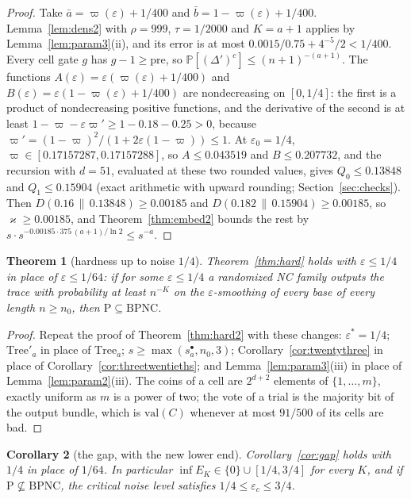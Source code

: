 \documentclass[11pt]{amsart}
\newtheorem{theorem}{Theorem}
\newtheorem{corollary}[theorem]{Corollary}
\theoremstyle{definition}
\theoremstyle{remark}
\newcommand{\eps}{\varepsilon}
\newcommand{\val}{\mathrm{val}}
\newcommand{\PP}{\mathbb{P}}
\begin{document}
\begin{proof}
Take $\bar a=\varpi(\eps)+1/400$ and $\bar b=1-\varpi(\eps)+1/400$. Lemma~\ref{lem:dens2} with
$\rho=999$, $\tau=1/2000$ and $K=a+1$ applies by Lemma~\ref{lem:param3}(ii), and its error is at
most $0.0015/0.75+4^{-5}/2<1/400$. Every cell gate $g$ has $g-1\ge\mathrm{pre}$, so
$\PP[(\Delta')^c]\le(n+1)^{-(a+1)}$. The functions $A(\eps)=\eps(\varpi(\eps)+1/400)$ and
$B(\eps)=\eps(1-\varpi(\eps)+1/400)$ are nondecreasing on $[0,1/4]$: the first is a product of
nondecreasing positive functions, and the derivative of the second is at least
$1-\varpi-\eps\varpi'\ge1-0.18-0.25>0$, because $\varpi'=(1-\varpi)^2/(1+2\eps(1-\varpi))\le1$.
At $\eps_0=1/4$, $\varpi\in[0.17157287,0.17157288]$, so $A\le0.043519$ and $B\le0.207732$, and
the recursion with $d=51$, evaluated at these two rounded values, gives $Q_0\le0.13848$ and
$Q_1\le0.15904$ (exact arithmetic with upward rounding; Section~\ref{sec:checks}). Then
$D(0.16\,\|\,0.13848)\ge0.00185$ and $D(0.182\,\|\,0.15904)\ge0.00185$, so $\varkappa\ge0.00185$, and Theorem~\ref{thm:embed2} bounds the
rest by $s\cdot s^{-0.00185\cdot375\,(a+1)/\ln2}\le s^{-a}$.
\end{proof}

\begin{theorem}[hardness up to noise $1/4$]\label{thm:hard3}
Theorem~\ref{thm:hard} holds with $\eps\le1/4$ in place of $\eps\le1/64$: if for some
$\eps\le1/4$ a randomized NC family outputs the trace with probability at least $n^{-K}$ on the
$\eps$-smoothing of every base of every length $n\ge n_0$, then $\mathrm P\subseteq\mathrm{BPNC}$.
\end{theorem}

\begin{proof}
Repeat the proof of Theorem~\ref{thm:hard2} with these changes: $\eps^*=1/4$;
$\mathrm{Tree}'_a$ in place of $\mathrm{Tree}_a$; $s\ge\max(s^\bullet_a,n_0,3)$;
Corollary~\ref{cor:twentythree} in place of Corollary~\ref{cor:threetwentieths}; and
Lemma~\ref{lem:param3}(iii) in place of Lemma~\ref{lem:param2}(iii). The coins of a cell are
$2^{d+2}$ elements of $\{1,\dots,m\}$, exactly uniform as $m$ is a power of two; the vote of a trial is the majority bit of the output bundle,
which is $\val(C)$ whenever at most $91/500$ of its cells are bad.
\end{proof}

\begin{corollary}[the gap, with the new lower end]\label{cor:gap3}
Corollary~\ref{cor:gap} holds with $1/4$ in place of $1/64$. In particular
$\inf E_K\in\{0\}\cup[1/4,3/4]$ for every $K$, and if $\mathrm P\not\subseteq\mathrm{BPNC}$,
the critical noise level satisfies $1/4\le\eps_c\le3/4$.
\end{corollary}
\end{document}
